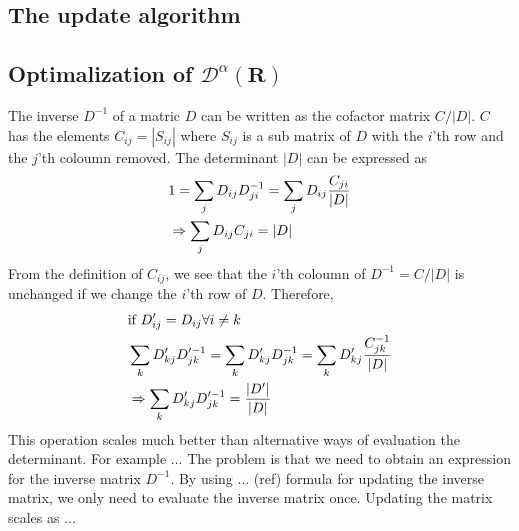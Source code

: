 \documentclass[a4paper,10pt,twocolumn]{article} %
\newcommand{\ts}[1]{\textbf{#1}}
\begin{document}
\subsection{The update algorithm}%

\subsection{Optimalization of $\mathcal D^\alpha(\ts R)$} %

The inverse $D^{-1}$ of a matric $D$ can be written as the cofactor matrix $C/|D|$. $C$ has the elements $C_{ij}=|S_{ij}|$ where $S_{ij}$ is a sub matrix of $D$ with the $i$'th row and the 
$j$'th coloumn removed. The determinant $|D|$ can be expressed as 
\begin{align}
	&1=\sum_j D_{ij}D^{-1}_{ji}=\sum_jD_{ij}\frac{C_{ji}}{|D|}\notag\\
	&\Rightarrow \sum_jD_{ij}C_{ji}=|D|
\end{align}
From the definition of $C_{ij}$, we see that the $i$'th coloumn of $D^{-1}=C/|D|$ is unchanged if we change the $i$'th row of $D$.
Therefore,
\begin{align}
	&\text{if } D'_{ij}=D_{ij} \forall i\neq k\notag\\
	&\sum_k D'_{kj} D'^{-1}_{jk} = \sum_k D'_{kj} D^{-1}_{jk} = \sum_k D'_{kj} \frac{C^{-1}_{jk}}{|D|}\notag\\ 
	&\Rightarrow \sum_k D'_{kj} D'^{-1}_{jk} = \frac{|D'|}{|D|}\label{eqDet}
\end{align}
This operation scales much better than alternative ways of evaluation the determinant. For example ... 
The problem is that we need to obtain an expression for the inverse matrix $D^{-1}$. By using ... (ref) formula for updating the inverse
matrix, we only need to evaluate the inverse matrix once. Updating the matrix scales as ...
\end{document}
